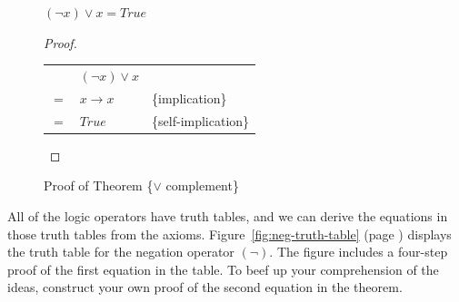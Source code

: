 \begin{figure}
\begin{theorem}
$(\neg x) \vee x = True$
\end{theorem}
\begin{proof}
\mbox{}\\
\begin{tabular}{lll}
    & $(\neg x) \vee x$ & \\
$=$ & $x \rightarrow x$ & \{implication\} \\
$=$ & $True$            & \{self-implication\} \\
\end{tabular}

\end{proof}
\caption{Proof of Theorem \{$\vee$ complement\}}
\label{fig:or-complement-thm}
\end{figure}

All of the logic operators have truth tables,
and we can derive the equations in those truth tables from the axioms.
Figure~\ref{fig:neg-truth-table} (page \pageref{fig:neg-truth-table})
displays the truth table
for the negation operator $(\neg)$.
The figure includes a four-step proof of the first equation in
the table.
To beef up your comprehension of the ideas,
construct your own proof of the second equation in the theorem.

